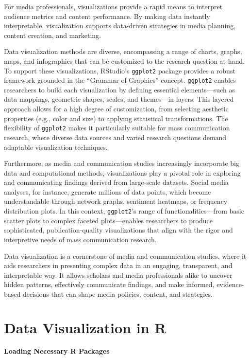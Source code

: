 \documentclass[
]{book}
\begin{document}
For media professionals, visualizations provide a rapid means to interpret audience metrics and content performance. By making data instantly interpretable, visualization supports data-driven strategies in media planning, content creation, and marketing.

Data visualization methods are diverse, encompassing a range of charts, graphs, maps, and infographics that can be customized to the research question at hand. To support these visualizations, RStudio's \texttt{ggplot2} package provides a robust framework grounded in the ``Grammar of Graphics'' concept. \texttt{ggplot2} enables researchers to build each visualization by defining essential elements---such as data mappings, geometric shapes, scales, and themes---in layers. This layered approach allows for a high degree of customization, from selecting aesthetic properties (e.g., color and size) to applying statistical transformations. The flexibility of \texttt{ggplot2} makes it particularly suitable for mass communication research, where diverse data sources and varied research questions demand adaptable visualization techniques.

Furthermore, as media and communication studies increasingly incorporate big data and computational methods, visualizations play a pivotal role in exploring and communicating findings derived from large-scale datasets. Social media analyses, for instance, generate millions of data points, which become understandable through network graphs, sentiment heatmaps, or frequency distribution plots. In this context, \texttt{ggplot2}'s range of functionalities---from basic scatter plots to complex faceted plots---enables researchers to produce sophisticated, publication-quality visualizations that align with the rigor and interpretive needs of mass communication research.

Data visualization is a cornerstone of media and communication studies, where it aids researchers in presenting complex data in an engaging, transparent, and interpretable way. It allows scholars and media professionals alike to uncover hidden patterns, effectively communicate findings, and make informed, evidence-based decisions that can shape media policies, content, and strategies.

\section{Data Visualization in R}\label{data-visualization-in-r-1}

\textbf{Loading Necessary R Packages}
\end{document}
